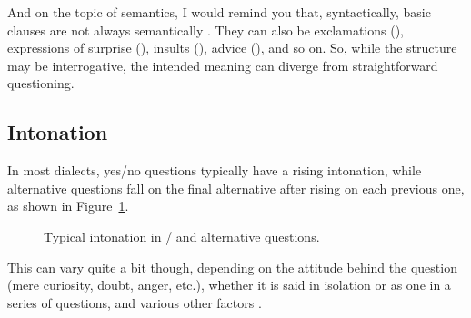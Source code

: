 And on the topic of semantics, I would remind you that, syntactically, basic  clauses are not always semantically . They can also be exclamations (), expressions of surprise (), insults (), advice (), and so on. So, while the structure may be interrogative, the intended meaning can diverge from straightforward questioning.

\subsection{Intonation}

In most dialects, yes/no questions typically have a rising intonation, while alternative questions fall on the final alternative after rising on each previous one, as shown in Figure~\ref{fig:question-intonation}.

\begin{figure}
    \caption{Typical intonation in / and alternative questions.}
    \label{fig:question-intonation}
\end{figure}

This can vary quite a bit though, depending on the attitude behind the question (mere curiosity, doubt, anger, etc.), whether it is said in isolation or as one in a series of questions, and various other factors \citep{Bartels1999}.


